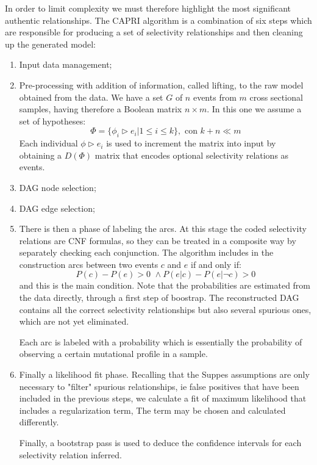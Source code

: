 In order to limit complexity we must therefore highlight the most significant authentic relationships.
The CAPRI algorithm is a combination of six steps which are responsible for producing a set of
selectivity relationships and then cleaning up the generated model:
\begin{enumerate}
    \item Input data management;
    \item Pre-processing with addition of information, called lifting, to the raw model obtained from the
          data. We have a set $G$ of $n$ events from $m$ cross sectional samples, having therefore a Boolean
          matrix $n \times m$. In this one we assume a set of hypotheses:
          \begin{equation*}
              \Phi = \{\phi_i \rhd e_i | 1 \leq i \leq k\}, \text{ con } k + n \ll m
          \end{equation*}
          Each individual $\phi \rhd e_i$ is used to increment the matrix into input by obtaining a
          $D(\Phi)$ matrix that encodes optional selectivity relations as events.
    \item DAG node selection;
    \item DAG edge selection;
    \item There is then a phase of labeling the arcs. At this stage the coded selectivity relations are CNF
          formulas, so they can be treated in a composite way by separately checking each conjunction. The algorithm
          includes in the construction arcs between two events $c$ and $e$ if and only if:
          \begin{equation*}
              P(c) - P(e) > 0 \,\,\land P(e | c) - P(e | \lnot c) > 0
          \end{equation*}
          and this is the main condition. Note that the probabilities are estimated from the data directly, through
          a first step of boostrap. The reconstructed DAG contains all the correct selectivity relationships but also
          several spurious ones, which are not yet eliminated.

          Each arc is labeled with a probability which is essentially the probability of observing a certain mutational
          profile in a sample.
    \item Finally a likelihood fit phase. Recalling that the Suppes assumptions are only necessary to "filter" spurious
          relationships, ie false positives that have been included in the previous steps, we calculate a fit of maximum
          likelihood that includes a regularization term, The term may be chosen and calculated differently.

          Finally, a bootstrap pass is used to deduce the confidence intervals for each selectivity relation inferred.
\end{enumerate}


